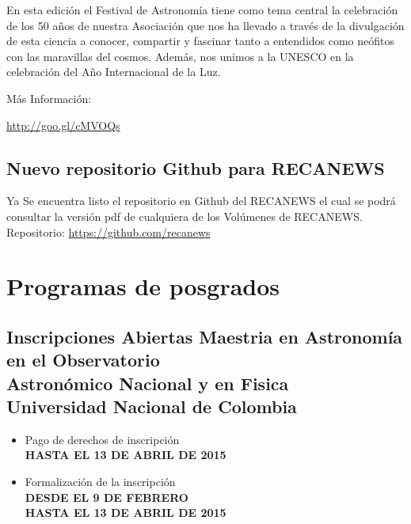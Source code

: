 \documentclass{book}
\begin{document}
\noindent En esta edición el Festival de Astronomía tiene como tema central la celebración de los 50 años de nuestra Asociación que nos ha llevado a través de la divulgación de esta ciencia a conocer, compartir y fascinar tanto a entendidos como neófitos con las maravillas del cosmos. Además, nos unimos a la UNESCO en la celebración del Año Internacional de la Luz.

\noindent Más Información:
\begin{center}
\url{http://goo.gl/cMVOQs}
\end{center}


\subsection{Nuevo repositorio Github para RECANEWS}

Ya Se encuentra listo el repositorio en Github del RECANEWS el cual se podrá consultar la versión pdf de cualquiera de los Volúmenes de RECANEWS.\\

Repositorio: \url{https://github.com/recanews}\\



\newpage

\section*{Programas de posgrados}


\subsection{Inscripciones Abiertas Maestria en Astronomía en el Observatorio\\ Astronómico Nacional y en Fisica\\ Universidad Nacional de Colombia}

\begin{itemize}
\item Pago de derechos de inscripción \\
\textbf{HASTA EL 13 DE ABRIL DE 2015}
\item Formalización de la inscripción\\
\textbf{DESDE EL 9 DE FEBRERO}\\
\textbf{HASTA EL 13 DE ABRIL DE 2015}
\end{itemize}
\end{document}
